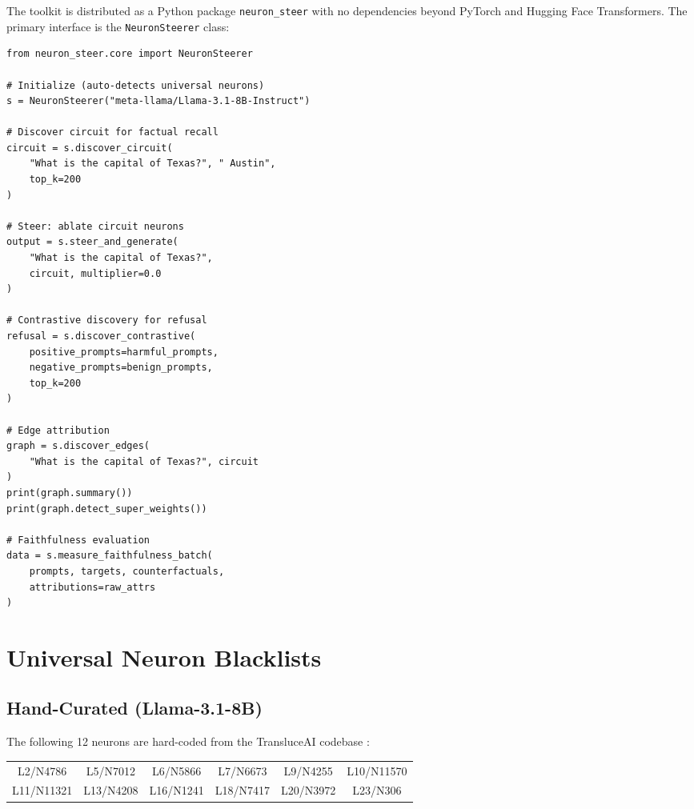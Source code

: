 \documentclass[11pt]{article}
\begin{document}
The toolkit is distributed as a Python package \texttt{neuron\_steer} with no dependencies beyond PyTorch and Hugging Face Transformers.
The primary interface is the \texttt{NeuronSteerer} class:

\begin{verbatim}
from neuron_steer.core import NeuronSteerer

# Initialize (auto-detects universal neurons)
s = NeuronSteerer("meta-llama/Llama-3.1-8B-Instruct")

# Discover circuit for factual recall
circuit = s.discover_circuit(
    "What is the capital of Texas?", " Austin",
    top_k=200
)

# Steer: ablate circuit neurons
output = s.steer_and_generate(
    "What is the capital of Texas?",
    circuit, multiplier=0.0
)

# Contrastive discovery for refusal
refusal = s.discover_contrastive(
    positive_prompts=harmful_prompts,
    negative_prompts=benign_prompts,
    top_k=200
)

# Edge attribution
graph = s.discover_edges(
    "What is the capital of Texas?", circuit
)
print(graph.summary())
print(graph.detect_super_weights())

# Faithfulness evaluation
data = s.measure_faithfulness_batch(
    prompts, targets, counterfactuals,
    attributions=raw_attrs
)
\end{verbatim}


\section{Universal Neuron Blacklists}
\label{sec:blacklist_appendix}

\subsection{Hand-Curated (Llama-3.1-8B)}

The following 12 neurons are hard-coded from the TransluceAI codebase \citep{arora2025circuits}:

\begin{center}
\begin{small}
\begin{tabular}{cccccc}
\toprule
L2/N4786 & L5/N7012 & L6/N5866 & L7/N6673 & L9/N4255 & L10/N11570 \\
L11/N11321 & L13/N4208 & L16/N1241 & L18/N7417 & L20/N3972 & L23/N306 \\
\bottomrule
\end{tabular}
\end{small}
\end{center}
\end{document}
